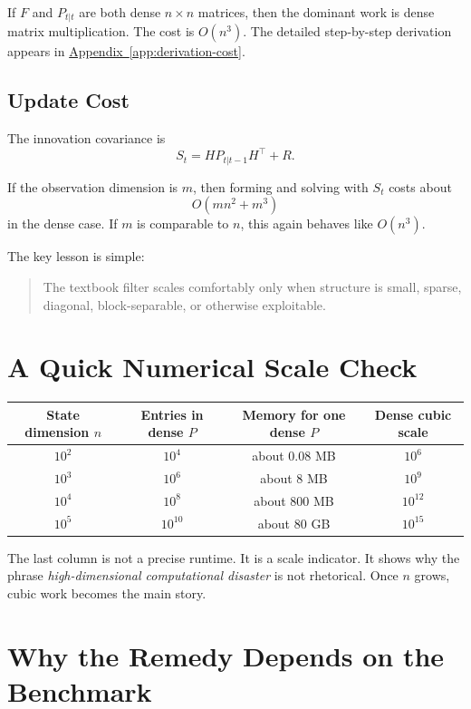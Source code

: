 \documentclass[12pt,a4paper]{article}
\begin{document}
If \(F\) and \(P_{t|t}\) are both dense \(n \times n\) matrices, then the dominant work is dense matrix multiplication. The cost is \(O(n^3)\). The detailed step-by-step derivation appears in \hyperref[app:derivation-cost]{Appendix~\ref*{app:derivation-cost}}.

\subsection{Update Cost}

The innovation covariance is
\[
S_t = H P_{t|t-1} H^\top + R.
\]

If the observation dimension is \(m\), then forming and solving with \(S_t\) costs about
\[
O(m n^2 + m^3)
\]
in the dense case. If \(m\) is comparable to \(n\), this again behaves like \(O(n^3)\).

The key lesson is simple:
\begin{quote}
The textbook filter scales comfortably only when structure is small, sparse, diagonal, block-separable, or otherwise exploitable.
\end{quote}

\section{A Quick Numerical Scale Check}

\begin{center}
\begin{tabular}{cccc}
\toprule
State dimension \(n\) & Entries in dense \(P\) & Memory for one dense \(P\) & Dense cubic scale \\
\midrule
\(10^2\) & \(10^4\) & about \(0.08\) MB & \(10^6\) \\
\(10^3\) & \(10^6\) & about \(8\) MB & \(10^9\) \\
\(10^4\) & \(10^8\) & about \(800\) MB & \(10^{12}\) \\
\(10^5\) & \(10^{10}\) & about \(80\) GB & \(10^{15}\) \\
\bottomrule
\end{tabular}
\end{center}

The last column is not a precise runtime. It is a scale indicator. It shows why the phrase \emph{high-dimensional computational disaster} is not rhetorical. Once \(n\) grows, cubic work becomes the main story.

\section{Why the Remedy Depends on the Benchmark}
\end{document}
